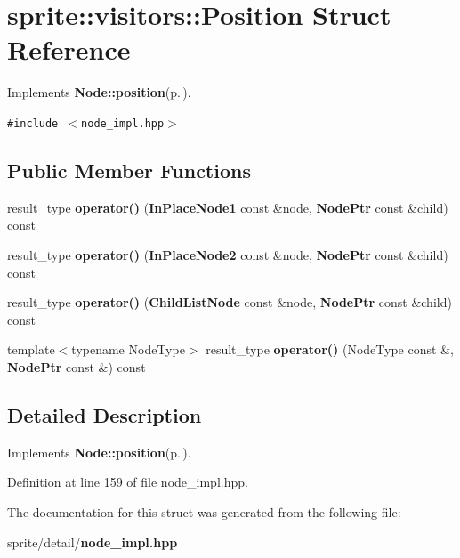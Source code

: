 \section{sprite::visitors::Position Struct Reference}
\label{structsprite_1_1visitors_1_1Position}
Implements {\bf Node::position}{\rm (p.\,\pageref{structsprite_1_1Node_a11})}.  


{\tt \#include $<$node\_\-impl.hpp$>$}

\subsection*{Public Member Functions}
\begin{CompactItemize}
\item 
result\_\-type {\bf operator()} ({\bf In\-Place\-Node1} const \&node, {\bf Node\-Ptr} const \&child) const \label{structsprite_1_1visitors_1_1Position_a0}

\item 
result\_\-type {\bf operator()} ({\bf In\-Place\-Node2} const \&node, {\bf Node\-Ptr} const \&child) const \label{structsprite_1_1visitors_1_1Position_a1}

\item 
result\_\-type {\bf operator()} ({\bf Child\-List\-Node} const \&node, {\bf Node\-Ptr} const \&child) const \label{structsprite_1_1visitors_1_1Position_a2}

\item 
template$<$typename Node\-Type$>$ result\_\-type {\bf operator()} (Node\-Type const \&, {\bf Node\-Ptr} const \&) const \label{structsprite_1_1visitors_1_1Position_a3}

\end{CompactItemize}


\subsection{Detailed Description}
Implements {\bf Node::position}{\rm (p.\,\pageref{structsprite_1_1Node_a11})}. 



Definition at line 159 of file node\_\-impl.hpp.

The documentation for this struct was generated from the following file:\begin{CompactItemize}
\item 
sprite/detail/{\bf node\_\-impl.hpp}\end{CompactItemize}
